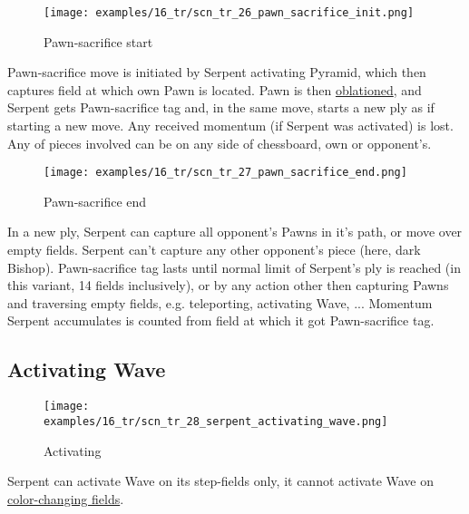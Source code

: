 \vspace*{-1.3\baselineskip}
\noindent
\begin{figure}[!h]
\texttt{[image: examples/16\_tr/scn\_tr\_26\_pawn\_sacrifice\_init.png]}
\caption{Pawn-sacrifice start}
\label{fig:scn_tr_26_pawn_sacrifice_init}
\end{figure}

Pawn-sacrifice move is initiated by Serpent activating Pyramid, which then
captures field at which own Pawn is located. Pawn is then
\hyperref[sec:Terms/Oblation]{oblationed}, and Serpent gets Pawn-sacrifice
tag and, in the same move, starts a new ply as if starting a new move. Any
received momentum (if Serpent was activated) is lost. Any of pieces involved
can be on any side of chessboard, own or opponent's.

\clearpage %

\vspace*{-2.1\baselineskip}
\noindent
\begin{figure}[!h]
\texttt{[image: examples/16\_tr/scn\_tr\_27\_pawn\_sacrifice\_end.png]}
\caption{Pawn-sacrifice end}
\label{fig:scn_tr_27_pawn_sacrifice_end}
\end{figure}

In a new ply, Serpent can capture all opponent's Pawns in it's path, or move over
empty fields. Serpent can't capture any other opponent's piece (here, dark Bishop).
Pawn-sacrifice tag lasts until normal limit of Serpent's ply is reached (in this
variant, 14 fields inclusively), or by any action other then capturing Pawns and
traversing empty fields, e.g. teleporting, activating Wave, ... Momentum Serpent
accumulates is counted from field at which it got Pawn-sacrifice tag.

\clearpage %

\subsection*{Activating Wave}
\label{sec:Tamoanchan Revisited/Serpent/Activating Wave}

\noindent
\begin{wrapfigure}[3]{l}{0.4\textwidth}
\centering
\texttt{[image: examples/16\_tr/scn\_tr\_28\_serpent\_activating\_wave.png]}
\caption{Activating}
\label{fig:scn_tr_28_serpent_activating_wave}
\end{wrapfigure}
Serpent can activate Wave on its step-fields only, it cannot activate Wave
on \hyperref[fig:scn_tr_17_serpent_neighbors]{color-changing fields}.

